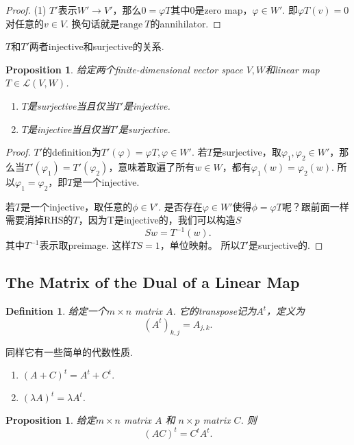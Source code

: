 \documentclass{article}
\newtheorem{proposition}[theorem]{Proposition}
\newtheorem{definition}[theorem]{Definition}
\newcommand\range[1]{\text{range}\ #1}
\begin{document}
\begin{proof}
(1) $T'$表示$W' \rightarrow V'$，那么$0 = \varphi T$其中$0$是zero map，$\varphi  \in W'$. 即$\varphi T(v) = 0$对任意的$v \in V$. 换句话就是$\range T$的annihilator.
\end{proof}

{\color{red} $T$和$T'$两者injective和surjective的关系}.

\begin{proposition}
\rm 给定两个finite-dimensional vector space $V,W$和linear map $T \in \mathcal{L}(V,W)$.

\begin{enumerate}
	\item $T$是surjective当且仅当$T'$是injective.
	\item $T$是injective当且仅当$T'$是surjective.
\end{enumerate}
\end{proposition}

\begin{proof}
$T'$的definition为$T'(\varphi) = \varphi T,\varphi \in W'$. 若$T$是surjective，取$\varphi_1,\varphi_2 \in W'$，那么当$T'(\varphi_1) = T'(\varphi_2)$，意味着取遍了所有$w \in W$，都有$\varphi_1(w)=\varphi_2(w)$. 所以$\varphi_1 = \varphi_2$，即$T$是一个injective.

若$T$是一个injective，取任意的$\phi \in V'$. 是否存在$\varphi \in W'$使得$\phi = \varphi T$呢？跟前面一样需要消掉RHS的$T$，因为T是injective的，我们可以构造$S$
$$
Sw= T^{-1}(w).
$$
其中$T^{-1}$表示取preimage. 这样$TS = 1$，单位映射。 所以$T'$是surjective的.
\end{proof}


\newpage
\subsection{The Matrix of the Dual of a Linear Map}
\begin{definition}
\rm 给定一个$m \times n$ matrix $A$. 它的transpose记为$A^{t}$，定义为
$$
(A^t)_{k,j} = A_{j,k}.
$$
\end{definition}

{\color{red} 同样它有一些简单的代数性质}.
\begin{enumerate}
	\item $(A+C)^t = A^t + C^t.$
	\item $(\lambda A)^t = \lambda A^t.$ 
\end{enumerate}

\begin{proposition}
\rm 给定$m\times n$ matrix $A$ 和 $n \times p$ matrix $C$. 则
$$
	(AC)^t = C^tA^t.
$$
\end{proposition}
\end{document}

